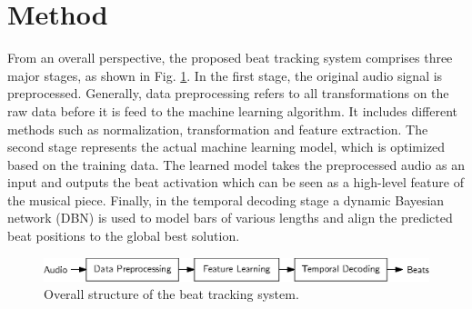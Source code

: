 \documentclass{scrartcl}
\begin{document}
\section{Method}
\label{sec:method}

From an overall perspective, the proposed beat tracking system comprises three major stages, as shown in Fig. \ref{fig:system}. In the first stage, the original audio signal is preprocessed. Generally, data preprocessing refers to all transformations on the raw data before it is feed to the machine learning algorithm. It includes different methods such as normalization, transformation and feature extraction. The second stage represents the actual machine learning model, which is optimized based on the  training data. The learned model takes the preprocessed audio as an input and outputs the beat activation which can be seen as a high-level feature of the musical piece. Finally, in the temporal decoding stage a dynamic Bayesian network (DBN) is used to model bars of various lengths and align the predicted beat positions to the global best solution.  
\begin{figure}[htbp]
\centering
\includegraphics[scale=1.0,trim={0 0 0 -0.5em}]{figures/beat_tracking_system.eps}
\caption{Overall structure of the beat tracking system.}
\label{fig:system}
\end{figure}  
\end{document}
